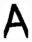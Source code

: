 \documentclass[russian,utf8,emptystyle]{eskdtext}
\begin{document}
\begin{figure}[!htb]
\includegraphics[width=\linewidth]{../data/learn/a/001}
\endminipage\hfill
{}

\end{figure}
\end{document}
